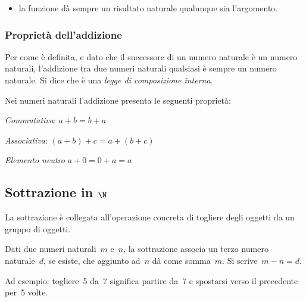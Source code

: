 \vspace{-1em}
\begin{osservazione}
\begin{itemize} [nosep]
\item la funzione dà sempre un risultato naturale qualunque sia l'argomento.
\end{itemize}

\end{osservazione}

\subsubsection{Proprietà dell'addizione}

Per come è definita, e dato che il successore di un numero naturale è un 
numero naturali, l'addizione tra due numeri naturali qualsiasi è sempre un
numero naturale. 
Si dice che è una \emph{legge di composizione interna}. 

Nei numeri naturali l'addizione presenta le seguenti proprietà:

\begin{itemize*}
 \item \emph{Commutativa}: \(a + b = b + a\)
 \item \emph{Associativa}: \((a + b) + c = a + (b + c)\)
 \item \emph{Elemento neutro} \(a + 0 = 0 + a = a\)
\end{itemize*}

\subsection{Sottrazione in \(\N\)}

La sottrazione è collegata all'operazione concreta di togliere degli oggetti 
da un gruppo di oggetti.

\begin{definizione}
Dati due numeri naturali~\(m\) e~\(n\), la sottrazione associa un terzo numero 
naturale~\(d\), se esiste, che aggiunto ad~\(n\) dà come somma~\(m\).
Si scrive~\(m - n = d\).
\end{definizione}

Ad esempio: togliere~5 da~7 significa partire da~7 e spostarsi verso il 
precedente per~5 volte.

